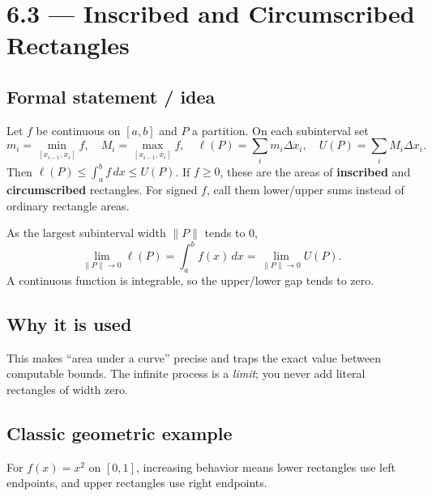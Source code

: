 \documentclass[11pt]{article}
\newcommand{\topic}[2]{\clearpage\section*{#1 --- #2}}
\newcommand{\dx}{\,dx}
\begin{document}
\topic{6.3}{Inscribed and Circumscribed Rectangles}
\subsection*{Formal statement / idea}
Let $f$ be continuous on $[a,b]$ and $P$ a partition. On each subinterval set
\[
m_i=\min_{[x_{i-1},x_i]}f,\quad M_i=\max_{[x_{i-1},x_i]}f,\quad
\ell(P)=\sum_i m_i\Delta x_i,\quad U(P)=\sum_i M_i\Delta x_i.
\]
Then $\ell(P)\le\int_a^b f\dx\le U(P)$. If $f\ge0$, these are the areas of \textbf{inscribed} and \textbf{circumscribed} rectangles. For signed $f$, call them lower/upper sums instead of ordinary rectangle areas.

As the largest subinterval width $\|P\|$ tends to $0$,
\[
\boxed{\lim_{\|P\|\to0}\ell(P)=\int_a^b f(x)\dx
=\lim_{\|P\|\to0}U(P).}
\]
A continuous function is integrable, so the upper/lower gap tends to zero.

\subsection*{Why it is used}
This makes ``area under a curve'' precise and traps the exact value between computable bounds. The infinite process is a \emph{limit}; you never add literal rectangles of width zero.

\subsection*{Classic geometric example}
For $f(x)=x^2$ on $[0,1]$, increasing behavior means lower rectangles use left endpoints, and upper rectangles use right endpoints.
\begin{center}
\end{center}
\end{document}
